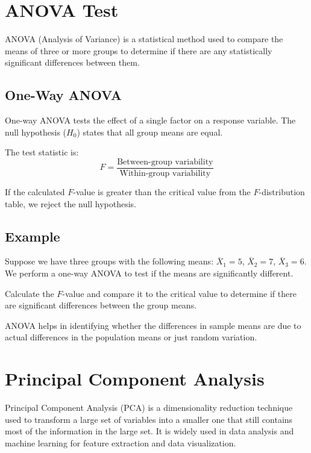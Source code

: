 \documentclass{article}
\begin{document}
\section{ANOVA Test}
ANOVA (Analysis of Variance) is a statistical method used to compare the means of three or more groups to determine if there are any statistically significant differences between them.

\subsection{One-Way ANOVA}
One-way ANOVA tests the effect of a single factor on a response variable. The null hypothesis (\(H_0\)) states that all group means are equal.

The test statistic is:
\[
F = \frac{\text{Between-group variability}}{\text{Within-group variability}}
\]

If the calculated \(F\)-value is greater than the critical value from the \(F\)-distribution table, we reject the null hypothesis.

\subsection{Example}
Suppose we have three groups with the following means: \( \bar{X}_1 = 5 \), \( \bar{X}_2 = 7 \), \( \bar{X}_3 = 6 \). We perform a one-way ANOVA to test if the means are significantly different.

Calculate the \(F\)-value and compare it to the critical value to determine if there are significant differences between the group means.

ANOVA helps in identifying whether the differences in sample means are due to actual differences in the population means or just random variation.

\section{Principal Component Analysis}
Principal Component Analysis (PCA) is a dimensionality reduction technique used to transform a large set of variables into a smaller one that still contains most of the information in the large set. It is widely used in data analysis and machine learning for feature extraction and data visualization.
\end{document}
